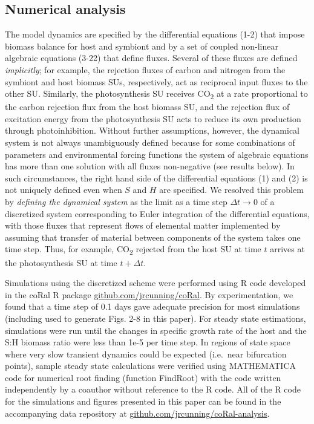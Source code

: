 \documentclass[]{elsarticle} %
\begin{document}
\subsection{Numerical analysis}\label{numerical-analysis}

The model dynamics are specified by the differential equations (1-2)
that impose biomass balance for host and symbiont and by a set of
coupled non-linear algebraic equations (3-22) that define fluxes.
Several of these fluxes are defined \emph{implicitly}; for example, the
rejection fluxes of carbon and nitrogen from the symbiont and host
biomass SUs, respectively, act as reciprocal input fluxes to the other
SU. Similarly, the photosynthesis SU receives CO\textsubscript{2} at a
rate proportional to the carbon rejection flux from the host biomass SU,
and the rejection flux of excitation energy from the photosynthesis SU
acts to reduce its own production through photoinhibition. Without
further assumptions, however, the dynamical system is not always
unambiguously defined because for some combinations of parameters and
environmental forcing functions the system of algebraic equations has
more than one solution with all fluxes non-negative (see results below).
In such circumstances, the right hand side of the differential equations
(1) and (2) is not uniquely defined even when \(S\) and \(H\) are
specified. We resolved this problem by \emph{defining the dynamical
system} as the limit as a time step \(\Delta t \rightarrow 0\) of a
discretized system corresponding to Euler integration of the
differential equations, with those fluxes that represent flows of
elemental matter implemented by assuming that transfer of material
between components of the system takes one time step. Thus, for example,
CO\textsubscript{2} rejected from the host SU at time \(t\) arrives at
the photosynthesis SU at time \(t + \Delta t\).

Simulations using the discretized scheme were performed using R code
developed in the coRal R package \url{github.com/jrcunning/coRal}. By
experimentation, we found that a time step of 0.1 days gave adequate
precision for most simulations (including used to generate Figs. 2-8 in
this paper). For steady state estimations, simulations were run until
the changes in specific growth rate of the host and the S:H biomass
ratio were less than 1e-5 per time step. In regions of state space where
very slow transient dynamics could be expected (i.e.~near bifurcation
points), sample steady state calculations were verified using
MATHEMATICA code for numerical root finding (function FindRoot) with the
code written independently by a coauthor without reference to the R
code. All of the R code for the simulations and figures presented in
this paper can be found in the accompanying data repository at
\url{github.com/jrcunning/coRal-analysis}.
\end{document}

